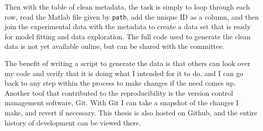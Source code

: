 \documentclass[11pt, oneside, openany]{scrbook}
\newenvironment{Shaded}{\begin{snugshade}}{\end{snugshade}}
\newcommand{\CommentTok}[1]{\textcolor[rgb]{0.56,0.35,0.01}{\textit{#1}}}
\newcommand{\KeywordTok}[1]{\textcolor[rgb]{0.13,0.29,0.53}{\textbf{#1}}}
\newcommand{\NormalTok}[1]{#1}
\begin{document}
\begin{Shaded}
\end{Shaded}

Then with the table of clean metadata, the task is simply to loop through each row, read the Matlab file given by \texttt{path}, add the unique ID as a column, and then join the experimental data with the metadata to create a data set that is ready for model fitting and data exploration. The full code used to generate the clean data is not yet available online, but can be shared with the committee.

The benefit of writing a script to generate the data is that others can look over my code and verify that it is doing what I intended for it to do, and I can go back to any step within the process to make changes if the need comes up. Another tool that contributed to the reproducibility is the version control management software, Git. With Git I can take a snapshot of the changes I make, and revert if necessary. This thesis is also hosted on Github, and the entire history of development can be viewed there.
\backmatter

\end{document}
